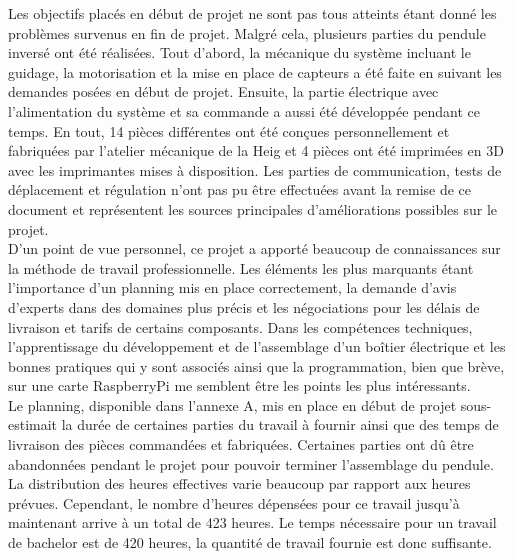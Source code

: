 Les objectifs placés en début de projet ne sont pas tous atteints étant donné les problèmes survenus en fin de projet.
Malgré cela, plusieurs parties du pendule inversé ont été réalisées. Tout d'abord, la mécanique du système incluant le guidage, la motorisation
et la mise en place de capteurs a été faite en suivant les demandes posées en début de projet. Ensuite, la partie électrique avec l'alimentation du
système et sa commande a aussi été développée pendant ce temps. En tout, 14 pièces différentes ont été conçues personnellement et fabriquées par l'atelier mécanique
de la \acrshort{Heig} et 4 pièces ont été imprimées en 3D avec les imprimantes mises à disposition. Les parties de communication, tests de déplacement
et régulation n'ont pas pu être effectuées avant la remise de ce document et représentent les sources principales d'améliorations possibles sur le
projet.\\

D'un point de vue personnel, ce projet a apporté beaucoup de connaissances sur la méthode de travail professionnelle. Les éléments les plus marquants
étant l'importance d'un planning mis en place correctement, la demande d'avis d'experts dans des domaines plus précis et les négociations pour les délais de livraison
et tarifs de certains composants. Dans les compétences techniques, l'apprentissage du développement et de l'assemblage d'un boîtier électrique et
les bonnes pratiques qui y sont associés ainsi que la programmation, bien que brève, sur une carte RaspberryPi me semblent être les points les plus
intéressants.\\

Le planning, disponible dans l'annexe A, mis en place en début de projet sous-estimait la durée de certaines parties du travail à fournir ainsi que des temps de livraison des
pièces commandées et fabriquées. Certaines parties ont dû être abandonnées pendant le projet pour pouvoir terminer l'assemblage du pendule. La
distribution des heures effectives varie beaucoup par rapport aux heures prévues. Cependant, le nombre d'heures dépensées pour ce travail jusqu'à
maintenant arrive à un total de 423 heures. Le temps nécessaire pour un travail de bachelor est de 420 heures, la quantité de travail fournie est donc
suffisante.